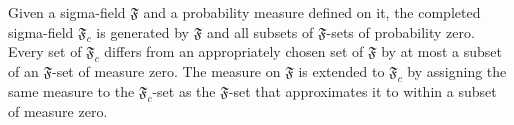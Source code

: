 Given a sigma-field $\mathfrak{F}$ and a probability measure defined on it, the completed sigma-field $\mathfrak{F}_c$ is generated by $\mathfrak{F}$ and all subsets of $\mathfrak{F}$-sets of probability zero. Every set of $\mathfrak{F}_c$ differs from an appropriately chosen set of $\mathfrak{F}$ by at most a subset of an $\mathfrak{F}$-set of measure zero. The measure on $\mathfrak{F}$ is extended to $\mathfrak{F}_c$ by assigning the same measure to the $\mathfrak{F}_c$-set as the $\mathfrak{F}$-set that approximates it to within a subset of measure zero.
